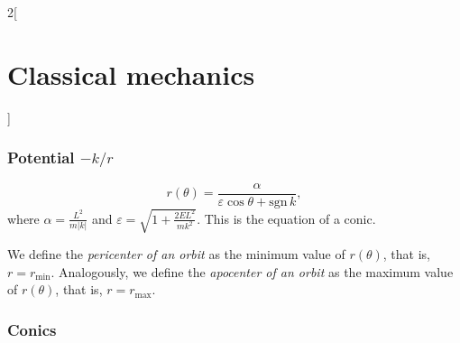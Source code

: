 \documentclass[../../../main.tex]{subfiles}
\begin{document}
\begin{multicols}{2}[\section{Classical mechanics}]
    \subsubsection*{Potential $-k/r$}
    \begin{prop}
        $$r(\theta)=\frac{\alpha}{\varepsilon\cos\theta+\text{sgn}\,k},$$where $\displaystyle\alpha=\frac{L^2}{m|k|}$ and $\displaystyle\varepsilon=\sqrt{1+\frac{2EL^2}{mk^2}}$. This is the equation of a conic.
    \end{prop}
    \begin{definition}
        We define the \textit{pericenter of an orbit} as the minimum value of $r(\theta)$, that is, $r=r_\text{min}$. Analogously, we define the \textit{apocenter of an orbit} as the maximum value of $r(\theta)$, that is, $r=r_\text{max}$.
    \end{definition}
    \subsubsection*{Conics}
\end{multicols}
\end{document}
